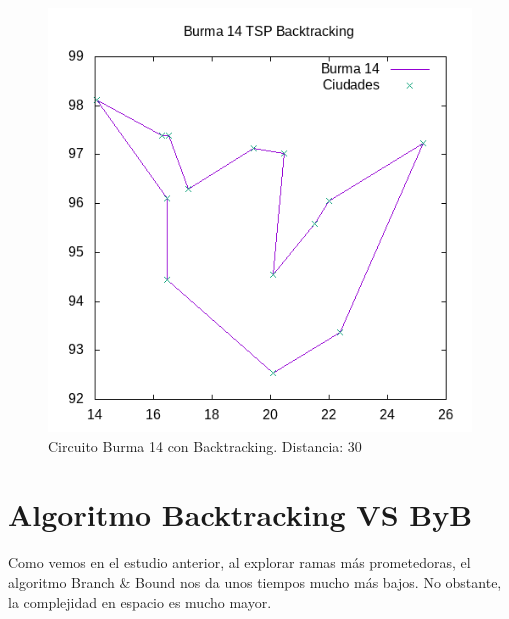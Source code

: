 \documentclass{article}
\begin{document}
	\begin{figure}[H]
		\centering
		\includegraphics[totalheight=6cm]{burma14back}
		\caption{Circuito Burma 14 con Backtracking. Distancia: 30}
		\label{fig:b14back}
	\end{figure}

	\section{Algoritmo Backtracking VS ByB}
	Como vemos en el estudio anterior, al explorar ramas más prometedoras, el algoritmo Branch \& Bound nos da unos tiempos mucho más bajos. No obstante, la complejidad en espacio es mucho mayor.
	
\end{document}
